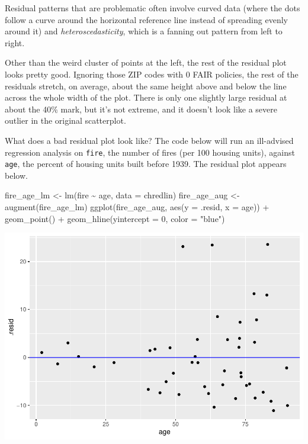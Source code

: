 \documentclass[
]{book}
\newenvironment{Shaded}{\begin{snugshade}}{\end{snugshade}}
\newcommand{\AttributeTok}[1]{\textcolor[rgb]{0.77,0.63,0.00}{#1}}
\newcommand{\DecValTok}[1]{\textcolor[rgb]{0.00,0.00,0.81}{#1}}
\newcommand{\FunctionTok}[1]{\textcolor[rgb]{0.00,0.00,0.00}{#1}}
\newcommand{\NormalTok}[1]{#1}
\newcommand{\OtherTok}[1]{\textcolor[rgb]{0.56,0.35,0.01}{#1}}
\newcommand{\SpecialCharTok}[1]{\textcolor[rgb]{0.00,0.00,0.00}{#1}}
\newcommand{\StringTok}[1]{\textcolor[rgb]{0.31,0.60,0.02}{#1}}
\begin{document}
Residual patterns that are problematic often involve curved data (where the dots follow a curve around the horizontal reference line instead of spreading evenly around it) and \emph{heteroscedasticity}, which is a fanning out pattern from left to right.

Other than the weird cluster of points at the left, the rest of the residual plot looks pretty good. Ignoring those ZIP codes with 0 FAIR policies, the rest of the residuals stretch, on average, about the same height above and below the line across the whole width of the plot. There is only one slightly large residual at about the 40\% mark, but it's not extreme, and it doesn't look like a severe outlier in the original scatterplot.

What does a bad residual plot look like? The code below will run an ill-advised regression analysis on \texttt{fire}, the number of fires (per 100 housing units), against \texttt{age}, the percent of housing units built before 1939. The residual plot appears below.

\begin{Shaded}
\begin{Highlighting}[]
\NormalTok{fire\_age\_lm }\OtherTok{\textless{}{-}} \FunctionTok{lm}\NormalTok{(fire }\SpecialCharTok{\textasciitilde{}}\NormalTok{ age, }\AttributeTok{data =}\NormalTok{ chredlin)}
\NormalTok{fire\_age\_aug }\OtherTok{\textless{}{-}} \FunctionTok{augment}\NormalTok{(fire\_age\_lm)}
\FunctionTok{ggplot}\NormalTok{(fire\_age\_aug, }\FunctionTok{aes}\NormalTok{(}\AttributeTok{y =}\NormalTok{ .resid, }\AttributeTok{x =}\NormalTok{ age)) }\SpecialCharTok{+}
    \FunctionTok{geom\_point}\NormalTok{() }\SpecialCharTok{+}
    \FunctionTok{geom\_hline}\NormalTok{(}\AttributeTok{yintercept =} \DecValTok{0}\NormalTok{, }\AttributeTok{color =} \StringTok{"blue"}\NormalTok{)}
\end{Highlighting}
\end{Shaded}

\includegraphics{intro_stats_files/figure-latex/unnamed-chunk-191-1.pdf}
\end{document}
